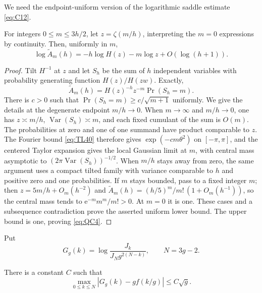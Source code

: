 We need the endpoint-uniform version of the logarithmic saddle estimate
\eqref{eq:C12}.

\begin{lemma}\label{lem:uniform-saddle}
For integers $0\le m\le3h/2$, let $z=\zeta(m/h)$, interpreting the
$m=0$ expressions by continuity. Then, uniformly in $m$,
\begin{equation}
 \log \widetilde A_m(h)=-h\log H(z)-m\log z+O(\log(h+1)).
 \label{eq:QC4}
\end{equation}
\end{lemma}

\begin{proof}
Tilt $H^{-1}$ at $z$ and let
$S_h$ be the sum of $h$ independent variables with probability
generating function $H(z)/H(zw)$. Exactly,
\[
 \widetilde A_m(h)=H(z)^{-h}z^{-m}\Pr(S_h=m).
\]
There is $c>0$ such that $\Pr(S_h=m)\ge c/\sqrt{m+1}$ uniformly.
We give the details at the degenerate endpoint $m/h\to0$.
When $m\to\infty$ and $m/h\to0$, one has $z\asymp m/h$,
$\operatorname{Var}(S_h)\asymp m$, and each fixed cumulant of the
sum is $O(m)$. The probabilities at zero and one of one summand have
product comparable to $z$. The Fourier bound \eqref{eq:TL40} therefore
gives $\exp(-cm\theta^2)$ on $[-\pi,\pi]$, and the centered Taylor
expansion gives the local Gaussian limit at $m$, with central mass
asymptotic to $(2\pi\operatorname{Var}(S_h))^{-1/2}$.
When $m/h$ stays away from zero, the same argument uses a compact
tilted family with variance comparable to $h$ and positive zero and
one probabilities. If $m$ stays bounded, pass to a fixed integer $m$;
then $z=5m/h+O_m(h^{-2})$ and
$\widetilde A_m(h)=(h/5)^m/m!\,(1+O_m(h^{-1}))$, so the central mass tends to
$\mathrm{e}^{-m}m^m/m!>0$. At $m=0$ it is one.
These cases and a subsequence contradiction prove the asserted uniform
lower bound. The upper bound is one, proving \eqref{eq:QC4}.
\end{proof}

Put
\[
 G_g(k)=\log\frac{J_k}{J_Ng^{2(N-k)}},\qquad N=3g-2.
\]

\begin{lemma}\label{lem:log-comparison}
There is a constant $C$ such that
\begin{equation}
 \max_{0\le k\le N}|G_g(k)-g f(k/g)|\le C\sqrt g.
 \label{eq:QC5}
\end{equation}
\end{lemma}

